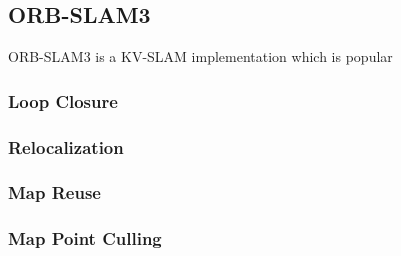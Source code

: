 \subsection{ORB-SLAM3}

ORB-SLAM3 is a KV-SLAM implementation which is popular 

\subsubsection{Loop Closure}
\subsubsection{Relocalization}
\subsubsection{Map Reuse}
\subsubsection{Map Point Culling}